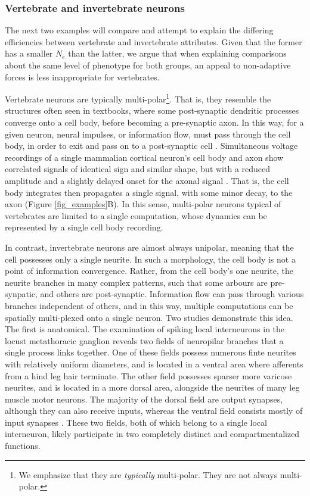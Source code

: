 \documentclass[twocolumn]{article}
\begin{document}
\subsubsection{Vertebrate and invertebrate neurons}

The next two examples will compare and attempt to explain the differing efficiencies between vertebrate and invertebrate attributes. Given that the former has a smaller $N_e$ than the latter, we argue that when explaining comparisons about the same level of phenotype for both groups, an appeal to non-adaptive forces is less inappropriate for vertebrates. 

Vertebrate neurons are typically multi-polar\footnote{We emphasize that they are \textit{typically} multi-polar. They are not always multi-polar.}. That is, they resemble the structures often seen in textbooks, where some post-synaptic dendritic processes converge onto a cell body, before becoming a pre-synaptic axon. In this way, for a given neuron, neural impulses, or information flow, must pass through the cell body, in order to exit and pass on to a post-synaptic cell \cite{Goaillard_2020, kandel2013principles}. Simultaneous voltage recordings of a single mammalian cortical neuron's cell body and axon show correlated signals of identical sign and similar shape, but with a reduced amplitude and a slightly delayed onset for the axonal signal \cite{hu_bean_2018}. That is, the cell body integrates then propagates a single signal, with some minor decay, to the axon (Figure \ref{fig_examples}B). In this sense, multi-polar neurons typical of vertebrates are limited to a single computation, whose dynamics can be represented by a single cell body recording. 

In contrast, invertebrate neurons are almost always unipolar, meaning that the cell possesses only a single neurite. In such a morphology, the cell body is not a point of information convergence. Rather, from the cell body's one neurite, the neurite branches in many complex patterns, such that some arbours are pre-synpatic, and others are post-synaptic. Information flow can pass through various branches independent of others, and in this way, multiple computations can be spatially multi-plexed onto a single neuron. Two studies demonstrate this idea. The first is anatomical. The examination of spiking local interneurons in the locust metathoracic ganglion reveals two fields of neuropilar branches that a single process links together. One of these fields possess numerous finte neurites with relatively uniform diameters, and is located in a ventral area where afferents from a hind leg hair terminate. The other field possesses sparser more varicose neurites, and is located in a more dorsal area, alongside the neurites of many leg muscle motor neurons. The majority of the dorsal field are output synapses, although they can also receive inputs, whereas the ventral field consists mostly of input synapses \cite{watson_burrows_1985}. These two fields, both of which belong to a single local interneuron, likely participate in two completely distinct and compartmentalized functions. 
\end{document}
